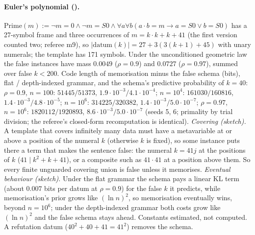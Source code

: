 \paragraph{Euler's polynomial ().} $\mathrm{Prime}(m):=\neg m=0\wedge\neg m=S0\wedge\forall a\forall b(a\cdot b=m\to a=S0\vee b=S0)$ has a 27-symbol frame and three occurrences of $m=k\cdot k+k+41$ (the first version counted two; referee m9), so $|\text{datum}(k)|=27+3(3(k+1)+45)$ with unary numerals; the template has 171 symbols. Under the unconditioned geometric law the false instances have mass $0.0049$ ($\rho=0.9$) and $0.0727$ ($\rho=0.97$), summed over false $k<200$. Code length of memorisation minus the false schema (bits), flat / depth-indexed grammar, and the schema's predictive probability of $k=40$: $\rho=0.9$, $n=100$: $51445/51373$, $1.9\cdot10^{-3}/4.1\cdot10^{-4}$; $n=10^4$: $161030/160816$, $1.4\cdot10^{-3}/4.8\cdot10^{-5}$; $n=10^6$: $314225/320382$, $1.4\cdot10^{-3}/5.0\cdot10^{-7}$; $\rho=0.97$, $n=10^6$: $1820112/1920893$, $8.6\cdot10^{-3}/5.0\cdot10^{-7}$ (seeds 5, 6; primality by trial division; the referee's closed-form recomputation is identical). \emph{Covering (sketch).} A template that covers infinitely many data must have a metavariable at or above a position of the numeral $k$ (otherwise $k$ is fixed), so some instance puts there a term that makes the sentence false: the numeral $k=41j$ at the positions of $k$ ($41\mid k^2+k+41$), or a composite such as $41\cdot41$ at a position above them. So every finite unguarded covering union is false unless it memorises. \emph{Eventual behaviour (sketch).} Under the flat grammar the schema pays a linear KL term (about $0.007$ bits per datum at $\rho=0.9$) for the false $k$ it predicts, while memorisation's prior grows like $(\ln n)^2$, so memorisation eventually wins, beyond $n=10^6$; under the depth-indexed grammar both costs grow like $(\ln n)^2$ and the false schema stays ahead. Constants estimated, not computed. A refutation datum ($40^2+40+41=41^2$) removes the schema.
